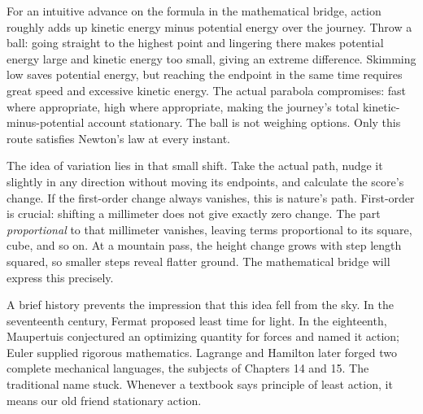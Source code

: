 \begin{mainline}
For an intuitive advance on the formula in the mathematical bridge, action roughly adds up kinetic energy minus potential energy over the journey. Throw a ball: going straight to the highest point and lingering there makes potential energy large and kinetic energy too small, giving an extreme difference. Skimming low saves potential energy, but reaching the endpoint in the same time requires great speed and excessive kinetic energy. The actual parabola compromises: fast where appropriate, high where appropriate, making the journey's total kinetic-minus-potential account stationary. The ball is not weighing options. Only this route satisfies Newton's law at every instant.
\end{mainline}

\begin{center}
\end{center}

The idea of variation lies in that small shift. Take the actual path, nudge it slightly in any direction without moving its endpoints, and calculate the score's change. If the first-order change always vanishes, this is nature's path. First-order is crucial: shifting a millimeter does not give exactly zero change. The part \emph{proportional} to that millimeter vanishes, leaving terms proportional to its square, cube, and so on. At a mountain pass, the height change grows with step length squared, so smaller steps reveal flatter ground. The mathematical bridge will express this precisely.

A brief history prevents the impression that this idea fell from the sky. In the seventeenth century, Fermat proposed least time for light. In the eighteenth, Maupertuis conjectured an optimizing quantity for forces and named it action; Euler supplied rigorous mathematics. Lagrange and Hamilton later forged two complete mechanical languages, the subjects of Chapters 14 and 15. The traditional name stuck. Whenever a textbook says principle of least action, it means our old friend stationary action.

